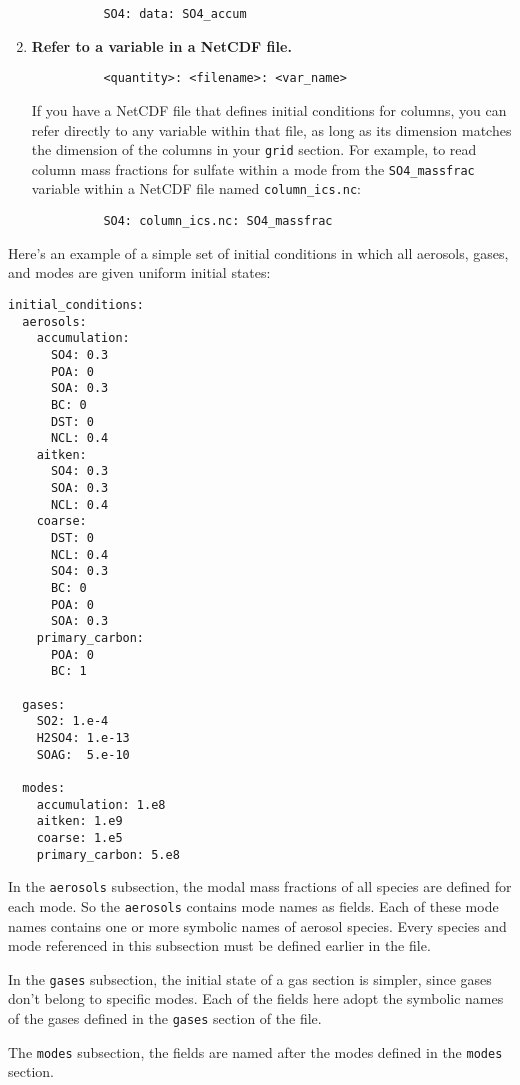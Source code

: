 \begin{enumerate}
\begin{verbatim}
          SO4: data: SO4_accum
        \end{verbatim}
  \item {\bf Refer to a variable in a NetCDF file.}
        \begin{verbatim}
          <quantity>: <filename>: <var_name>
        \end{verbatim}
        If you have a NetCDF file that defines initial conditions for columns,
        you can refer directly to any variable within that file, as long as its
        dimension matches the dimension of the columns in your
        \texttt{grid} section. For example, to read column mass fractions for
        sulfate within a mode from the \texttt{SO4\_massfrac} variable within a
        NetCDF file named \texttt{column\_ics.nc}:
        \begin{verbatim}
          SO4: column_ics.nc: SO4_massfrac
        \end{verbatim}
\end{enumerate}

Here's an example of a simple set of initial conditions in which all aerosols,
gases, and modes are given uniform initial states:

\begin{verbatim}
initial_conditions:
  aerosols:
    accumulation:
      SO4: 0.3
      POA: 0
      SOA: 0.3
      BC: 0
      DST: 0
      NCL: 0.4
    aitken:
      SO4: 0.3
      SOA: 0.3
      NCL: 0.4
    coarse:
      DST: 0
      NCL: 0.4
      SO4: 0.3
      BC: 0
      POA: 0
      SOA: 0.3
    primary_carbon:
      POA: 0
      BC: 1

  gases:
    SO2: 1.e-4
    H2SO4: 1.e-13
    SOAG:  5.e-10

  modes:
    accumulation: 1.e8
    aitken: 1.e9
    coarse: 1.e5
    primary_carbon: 5.e8
\end{verbatim}

In the \texttt{aerosols} subsection, the modal mass fractions of all species
are defined for each mode. So the \texttt{aerosols} contains mode names as fields.
Each of these mode names contains one or more symbolic names of aerosol species.
Every species and mode referenced in this subsection must be defined earlier
in the file.

In the \texttt{gases} subsection, the initial state of a gas section is simpler,
since gases don't belong to specific modes. Each of the fields here adopt the
symbolic names of the gases defined in the \texttt{gases} section of the file.

The \texttt{modes} subsection, the fields are named after the modes defined in
the \texttt{modes} section.

